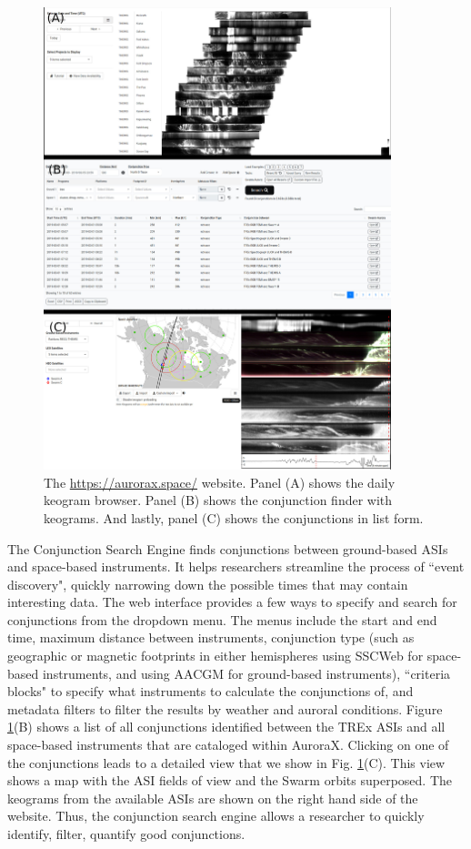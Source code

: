 \documentclass[utf8]{FrontiersinHarvard} %
\begin{document}
\begin{figure}
    \centering
    \includegraphics[width=0.9\textwidth]{figures/fig1.jpg}
    \caption{The \url{https://aurorax.space/} website. Panel (A) shows the daily keogram browser. Panel (B) shows the conjunction finder with keograms. And lastly, panel (C) shows the conjunctions in list form.}
    \label{fig1}
\end{figure}

The Conjunction Search Engine finds conjunctions between ground-based ASIs and space-based instruments. It helps researchers streamline the process of ``event discovery", quickly narrowing down the possible times that may contain interesting data. The web interface provides a  few ways to specify and search for conjunctions from the dropdown menu. The menus include the start and end time, maximum distance between instruments, conjunction type (such as geographic or magnetic footprints in either hemispheres using SSCWeb for space-based instruments, and using AACGM \citep{Shepherd2014} for ground-based instruments), ``criteria blocks" to specify what instruments to calculate the conjunctions of, and metadata filters to filter the results by weather and auroral conditions. Figure \ref{fig1}(B) shows a list of all conjunctions identified between the TREx ASIs and all space-based instruments that are cataloged within AuroraX. Clicking on one of the conjunctions leads to a detailed view that we show in Fig. \ref{fig1}(C). This view shows a map with the ASI fields of view and the Swarm orbits superposed. The keograms from the available ASIs are shown on the right hand side of the website. Thus, the conjunction search engine allows a researcher to quickly identify, filter, quantify good conjunctions.
\end{document}
